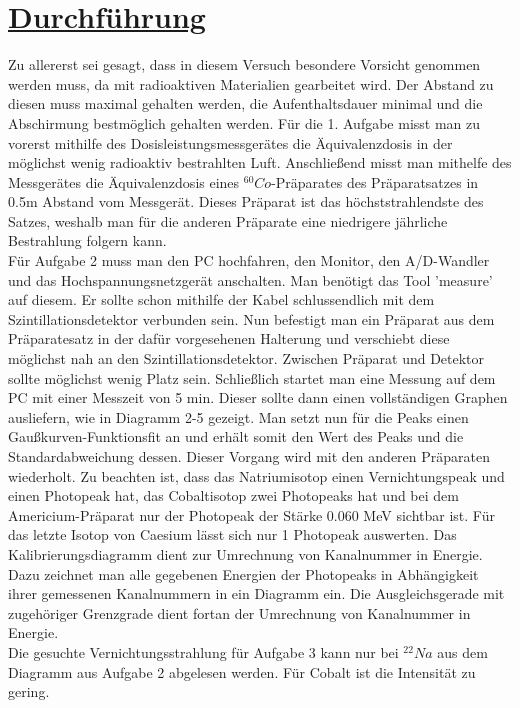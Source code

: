 \documentclass[11pt,a4paper]{article}
\begin{document}
 \section{\underline{Durchführung}}
 Zu allererst sei gesagt, dass in diesem Versuch besondere Vorsicht genommen werden muss, da mit radioaktiven Materialien gearbeitet wird. Der Abstand zu diesen muss maximal gehalten werden, die Aufenthaltsdauer minimal und die Abschirmung bestmöglich gehalten werden.
  Für die 1. Aufgabe misst man zu vorerst mithilfe des Dosisleistungsmessgerätes die Äquivalenzdosis in der möglichst wenig radioaktiv bestrahlten Luft. 
  Anschließend misst man mithelfe des Messgerätes die Äquivalenzdosis eines $^{60}Co$-Präparates des Präparatsatzes in 0.5m Abstand vom Messgerät. 
  Dieses Präparat ist das höchststrahlendste des Satzes, weshalb man für die anderen Präparate eine niedrigere jährliche Bestrahlung folgern kann. \\
 Für Aufgabe 2 muss man den PC hochfahren, den Monitor, den A/D-Wandler und das Hochspannungsnetzgerät anschalten. Man benötigt das Tool 'measure' auf diesem. 
 Er sollte schon mithilfe der Kabel schlussendlich mit dem Szintillationsdetektor verbunden sein. Nun befestigt man ein Präparat aus dem Präparatesatz in der dafür vorgesehenen Halterung und verschiebt diese möglichst nah an den Szintillationsdetektor.
  Zwischen Präparat und Detektor sollte möglichst wenig Platz sein.
  Schließlich startet man eine Messung auf dem PC mit einer Messzeit von 5 min. Dieser sollte dann einen vollständigen Graphen ausliefern, wie in Diagramm 2-5 gezeigt. Man setzt nun für die Peaks einen Gaußkurven-Funktionsfit an und erhält somit den Wert des Peaks und die Standardabweichung dessen.
  Dieser Vorgang wird mit den anderen Präparaten wiederholt.
  Zu beachten ist, dass das Natriumisotop einen Vernichtungspeak und einen Photopeak hat, das Cobaltisotop zwei Photopeaks hat und bei dem  Americium-Präparat nur der Photopeak der Stärke 0.060 MeV sichtbar ist. 
  Für das letzte Isotop von Caesium lässt sich nur 1 Photopeak auswerten.
  Das Kalibrierungsdiagramm dient zur Umrechnung von Kanalnummer in Energie. Dazu zeichnet man alle gegebenen Energien der Photopeaks in Abhängigkeit ihrer gemessenen Kanalnummern in ein Diagramm ein. Die Ausgleichsgerade mit zugehöriger Grenzgrade dient fortan der Umrechnung von Kanalnummer in Energie.
  \\Die gesuchte Vernichtungsstrahlung für Aufgabe 3 kann nur bei $^{22}Na$ aus dem Diagramm aus Aufgabe 2 abgelesen werden. 
  Für Cobalt ist die Intensität zu gering. 
\end{document}
